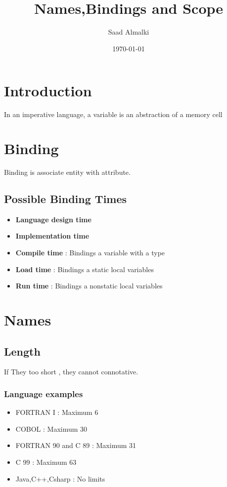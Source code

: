 \documentclass[12pt]{article}
\title{Names,Bindings and Scope}
\author{Saad Almalki}
\date{\today}
\begin{document}
\maketitle

\section{Introduction} 
In an imperative language, a variable is an abstraction of a memory cell

\section{Binding}
Binding is associate entity with attribute.

\subsection{Possible Binding Times}

\begin{itemize}
    \item \textbf{Language design time}
    \item \textbf{Implementation time}
    \item \textbf{Compile time} : Bindings a variable with a type
    \item \textbf{Load time} : Bindings a static local variables
    \item \textbf{Run time} : Bindings a nonstatic local variables
\end{itemize}


\section{Names} 

\subsection{Length}
If They too short , they cannot connotative.

\subsubsection{Language examples}
\begin{itemize}
    \item FORTRAN I : Maximum 6
    \item COBOL : Maximum 30
    \item FORTRAN 90 and C 89 : Maximum 31
    \item C 99 : Maximum 63
    \item Java,C++,Csharp : No limits
\end{itemize}
\end{document}
